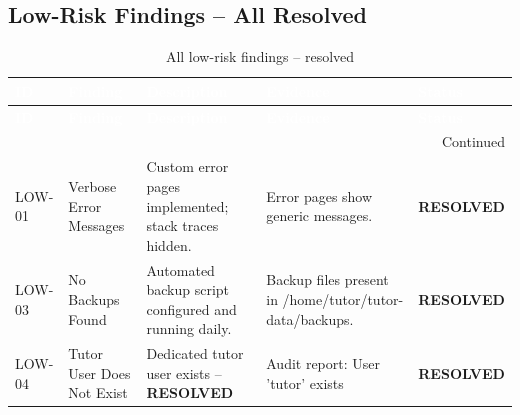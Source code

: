 \subsection{Low-Risk Findings – All Resolved}
\begin{center}
\begin{longtable}{|p{}|p{}|p{}|p{}|p{}|}
\caption[Low-Risk Findings]{All low-risk findings – resolved}
\label{tab:low-findings} \\
\hline
\rowcolor{mooveblue}
\textcolor{white}{\textbf{ID}} & \textcolor{white}{\textbf{Finding}} & \textcolor{white}{\textbf{Description}} & \textcolor{white}{\textbf{Evidence}} & \textcolor{white}{\textbf{Status}} \\
\hline
\endfirsthead
\hline
\rowcolor{mooveblue}
\textcolor{white}{\textbf{ID}} & \textcolor{white}{\textbf{Finding}} & \textcolor{white}{\textbf{Description}} & \textcolor{white}{\textbf{Evidence}} & \textcolor{white}{\textbf{Status}} \\
\hline
\endhead
\hline
\multicolumn{5}{|r|}{Continued} \\
\hline
\endfoot
\hline
\endlastfoot
LOW-01 & Verbose Error Messages & Custom error pages implemented; stack traces hidden. & Error pages show generic messages. & \textbf{RESOLVED} \\
LOW-03 & No Backups Found & Automated backup script configured and running daily. & Backup files present in /home/tutor/tutor-data/backups. & \textbf{RESOLVED} \\
LOW-04 & Tutor User Does Not Exist & Dedicated tutor user exists – \textbf{RESOLVED} & Audit report: User 'tutor' exists & \textbf{RESOLVED} \\
\hline
\end{longtable}
\end{center}

